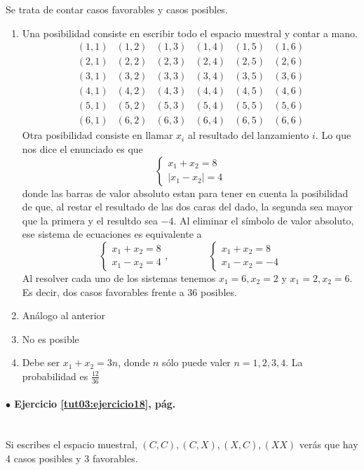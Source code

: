 \documentclass[10pt,a4paper]{article}\usepackage[]{graphicx}\usepackage[]{color}
\newcounter {cont01}
\begin{document}
Se trata de contar casos favorables y casos posibles. 
\begin{enumerate}
\item Una posibilidad consiste en escribir todo el espacio muestral y contar a mano.
\[\begin{array}{rrrrrr}
  (1,1)&(1,2)&(1,3)&(1,4)&(1,5)&{(1,6)}\\
  (2,1)&(2,2)&(2,3)&(2,4)&(2,5)&{(2,6)}\\
  (3,1)&(3,2)&(3,3)&(3,4)&(3,5)&{(3,6)}\\
  (4,1)&(4,2)&(4,3)&(4,4)&(4,5)&{(4,6)}\\
  (5,1)&(5,2)&(5,3)&(5,4)&(5,5)&{(5,6)}\\
  (6,1)&(6,2)&(6,3)&(6,4)&(6,5)&{(6,6)}
  \end{array} \]
 Otra posibilidad consiste en llamar $x_i$ al resultado del lanzamiento $i$. Lo que nos dice el enunciado es que 
\[\left\{\begin{array}{ll}
         x_1+x_2=8\\
         |x_1-x_2|=4
         \end{array}        
         \right.\]
donde las barras de valor absoluto estan para tener en cuenta la posibilidad de que, al restar el resultado de las dos caras del dado, la segunda sea mayor que la primera y el resultdo sea $-4$. Al eliminar el símbolo de valor absoluto, ese sistema de  ecuaciones es equivalente a
\[\left\{\begin{array}{ll}
         x_1+x_2=8\\
         x_1-x_2=4
         \end{array}\right.,\qquad \qquad 
         \left\{
              \begin{array}{ll}
               x_1+x_2=8\\
               x_1-x_2=-4
               \end{array}\right.\]
Al resolver cada uno de los sistemas tenemos $x_1=6, x_2=2$ y  $x_1=2, x_2=6$. Es decir, dos casos favorables frente a 36 posibles. 
\item Análogo al anterior
\item No es posible
\item Debe ser $x_1+x_2=3n$, donde $n$ sólo puede valer $n=1,2,3,4$. La probabilidad es $\frac{12}{36} $
 \end{enumerate}

\paragraph{\bf $\bullet$ Ejercicio \ref{tut03:ejercicio18}, pág. \pageref{tut03:ejercicio18}}
\label{tut03:ejercicio18:sol}\quad\\
Si escribes el espacio muestral, ${(C,C), (C,X), (X,C), (XX)}$ verás que 
hay 4 casos posibles y 3 favorables.
\end{document}
